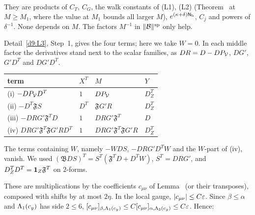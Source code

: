 \begin{detail}
\begin{step}[Seams]
\begin{itemize}
\end{itemize}
\end{step}
\begin{step}[Constants]
They are products of $C_T$, $C_G$, the walk constants of (L1), (L2) (Theorem~ at $M\ge M_1$, where the value at $M_1$ bounds all larger $M$), $e^{(\kappa+\delta)\mathsf N_{\rm b}}$, $C_j$ and powers of $\delta^{-1}$. None depends on $M$. The factors $M^{-1}$ in $\|\mathcal B\|^{\rm sp}$ only help.
\end{step}
\end{detail}

\begin{detail}\label{d9:N-tier}
\begin{step}
Detail~\ref{d9:L3}, Step~1, gives the four terms; here we take $W=0$. In each middle factor the derivatives stand next to the scalar families, as $DR=D-DP_\mathcal V$, $DG'$, $G'D^T$ and $DG'D^T$.
\begin{center}
\begin{tabular}{@{}llll@{}}
\toprule
term & $X^T$ & $M$ & $Y$\\
\midrule
(i) $-DP_\mathcal V D^T$ & $1$ & $DP_\mathcal V$ & $D^T_Z$\\
(ii) $-D^T\mathfrak FS$ & $D^T$ & $\mathfrak FG'R$ & $D^T_Z$\\
(iii) $-DRG'\mathfrak F^TD$ & $1$ & $DRG'\mathfrak F^T$ & $D$\\
(iv) $DRG'\mathfrak F^T\mathfrak FG'RD^T$ & $1$ & $DRG'\mathfrak F^T\mathfrak FG'R$ & $D^T_Z$\\
\bottomrule
\end{tabular}
\end{center}
The terms containing $W$, namely $-WDS$, $-DRG'D^TW$ and the $W$-part of (iv), vanish. We used $(\mathfrak BDS)^T=S^T(\mathfrak F^TD+D^TW)$, $S^T=DRG'$, and $D^T_ZD^T=\mathbf 1_Z\mathfrak F^T$ on $2$-forms.
\end{step}
\begin{step}
These are multiplications by the coefficients $c_{\mu\nu}$ of Lemma~ (or their transposes), composed with shifts by at most $2\eta$. In the local gauge, $|c_{\mu\nu}|\le C\varepsilon$. Since $\beta\le\alpha$ and $\Lambda_1(c_y)$ has side $2\le6$, $[c_{\mu\nu}]_{\beta,\Lambda_1(c_y)}\le C[c_{\mu\nu}]_{\alpha,\Lambda_3(c_y)}\le C\varepsilon$. Hence:

\end{step}
\end{detail}
